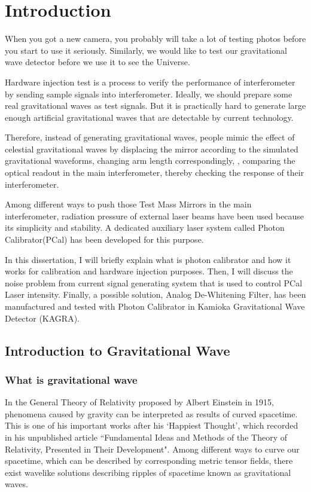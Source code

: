 \chapter{Introduction} 

When you got a new camera, you probably will take a lot of testing photos before you start to use it seriously. Similarly, we would like to test our gravitational wave detector before we use it to see the Universe.

Hardware injection test is a process to verify the performance of interferometer by sending sample signals into interferometer. Ideally, we should prepare some real gravitational waves as test signals. But it is practically hard to generate large enough artificial gravitational waves that are detectable by current technology. 

Therefore, instead of generating gravitational waves, people mimic the effect of celestial gravitational waves by displacing the mirror according to the simulated gravitational waveforms, changing arm length correspondingly, , comparing the optical readout in the main interferometer, thereby checking the response of their interferometer. 

Among different ways to push those Test Mass Mirrors in the main interferometer, radiation pressure of external laser beams have been used because its simplicity and stability. A dedicated auxiliary laser system called Photon Calibrator(PCal) has been developed for this purpose. 

In this dissertation, I will briefly explain what is photon calibrator and how it works for calibration and hardware injection purposes. Then, I will discuss the noise problem from current signal generating system that is used to control PCal Laser intensity. Finally, a possible solution, Analog De-Whitening Filter, has been manufactured and tested with Photon Calibrator in Kamioka Gravitational Wave Detector (KAGRA). 
 

\section{Introduction to Gravitational Wave}
\subsection{What is gravitational wave}

In the General Theory of Relativity proposed by Albert Einstein in 1915, phenomena caused by gravity can be interpreted as results of curved spacetime. This is one of his important works after his `Happiest Thought', which recorded in his unpublished article ``Fundamental Ideas and Methods of the Theory of Relativity, Presented in Their Development"\cite{Einstein:happy}. Among different ways to curve our spacetime, which can be described by corresponding metric tensor fields, there exist wavelike solutions describing ripples of spacetime known as gravitational waves.

